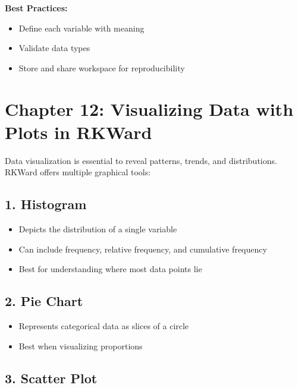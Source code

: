 \documentclass[
  letterpaper,
  DIV=11,
  numbers=noendperiod]{scrreprt}
\providecommand{\tightlist}{%
  \setlength{\itemsep}{0pt}\setlength{\parskip}{0pt}}
\begin{document}
\textbf{Best Practices:}

\begin{itemize}
\tightlist
\item
  Define each variable with meaning\\
\item
  Validate data types\\
\item
  Store and share workspace for reproducibility
\end{itemize}


\chapter{Chapter 12: Visualizing Data with Plots in
RKWard}\label{chapter-12-visualizing-data-with-plots-in-rkward}

Data visualization is essential to reveal patterns, trends, and
distributions. RKWard offers multiple graphical tools:

\section{1. Histogram}\label{histogram}

\begin{itemize}
\tightlist
\item
  Depicts the distribution of a single variable\\
\item
  Can include frequency, relative frequency, and cumulative frequency\\
\item
  Best for understanding where most data points lie
\end{itemize}

\section{2. Pie Chart}\label{pie-chart}

\begin{itemize}
\tightlist
\item
  Represents categorical data as slices of a circle\\
\item
  Best when visualizing proportions
\end{itemize}

\section{3. Scatter Plot}\label{scatter-plot}
\end{document}
